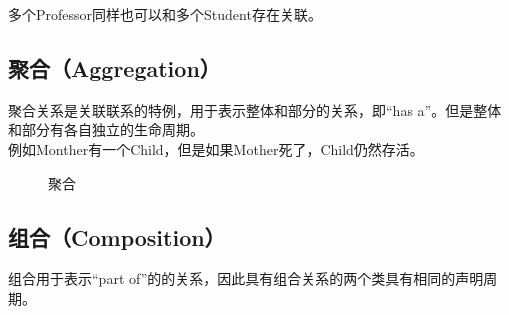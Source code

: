 多个Professor同样也可以和多个Student存在关联。\\

\begin{figure}[H]
    \centering
\end{figure}

\vspace{0.5cm}

\subsection{聚合（Aggregation）}

聚合关系是关联联系的特例，用于表示整体和部分的关系，即“has a”。但是整体和部分有各自独立的生命周期。\\

例如Monther有一个Child，但是如果Mother死了，Child仍然存活。\\

\begin{figure}[H]
    \centering
    \caption{聚合}
\end{figure}

\vspace{0.5cm}

\subsection{组合（Composition）}

组合用于表示“part of”的的关系，因此具有组合关系的两个类具有相同的声明周期。\\

